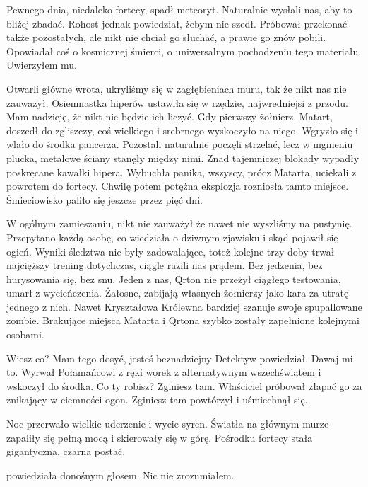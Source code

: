 Pewnego dnia, niedaleko fortecy, spadł meteoryt.
Naturalnie wysłali nas, aby to bliżej zbadać.
Rohost jednak powiedział, żebym nie szedł. 
Próbował przekonać także pozostałych, ale nikt nie chciał go słuchać, a prawie go znów pobili.
Opowiadał coś o kosmicznej śmierci, o uniwersalnym pochodzeniu tego materiału.
Uwierzyłem mu.

Otwarli główne wrota, ukryliśmy się w zagłębieniach muru, tak że nikt nas nie zauważył.
Osiemnastka hiperów ustawiła się w rzędzie, najwredniejsi z przodu.
Mam nadzieję, że nikt nie będzie ich liczyć.
Gdy pierwszy żołnierz, Matart, doszedł do zgliszczy, coś wielkiego i srebrnego wyskoczyło na niego.
Wgryzło się i wlało do środka pancerza.
Pozostali naturalnie poczęli strzelać, lecz w mgnieniu plucka, metalowe ściany stanęły między nimi.
Znad tajemniczej blokady wypadły poskręcane kawałki hipera.
Wybuchła panika, wszyscy, prócz Matarta, uciekali z powrotem do fortecy.
Chwilę potem potężna eksplozja rozniosła tamto miejsce.
Śmieciowisko paliło się jeszcze przez pięć dni.

W ogólnym zamieszaniu, nikt nie zauważył że nawet nie wyszliśmy na pustynię.
Przepytano każdą osobę, co wiedziała o dziwnym zjawisku i skąd pojawił się ogień.
Wyniki śledztwa nie były zadowalające, toteż kolejne trzy doby trwał najcięższy trening dotychczas, ciągle razili nas prądem.
Bez jedzenia, bez hurysowania się, bez snu. Jeden z nas, Qrton nie przeżył ciągłego testowania, umarł z wycieńczenia. 
Żałosne, zabijają własnych żołnierzy jako kara za utratę jednego z nich. Nawet Kryształowa Królewna bardziej szanuje swoje spupallowane zombie.
Brakujące miejsca Matarta i Qrtona szybko zostały zapełnione kolejnymi osobami.

\divider{}

\begin{dialogue}
\ds{} Wiesz co? Mam tego dosyć, jesteś beznadziejny \dm{} Detektyw powiedział. \dm{} Dawaj mi to. \dm{} Wyrwał Połamańcowi z ręki worek z alternatywnym wszechświatem i wskoczył do środka.
\ds{} Co ty robisz? Zginiesz tam. \dm{} Właściciel próbował złapać go za znikający w ciemności ogon. \dm{} Zginiesz tam \dm{} powtórzył i uśmiechnął się.
\end{dialogue}

\divider{}

Noc przerwało wielkie uderzenie i wycie syren.
Światła na głównym murze zapaliły się pełną mocą i skierowały się w górę.
Pośrodku fortecy stała gigantyczna, czarna postać.

\begin{dialogue}
\ds{}  \dm{} powiedziała donośnym głosem. Nic nie zrozumiałem.
\end{dialogue}

